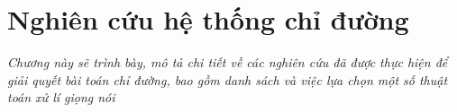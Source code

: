 \chapter{Nghiên cứu hệ thống chỉ đường}
\label{Chapter3}

\emph{Chương này sẽ trình bày, mô tả chi tiết về các nghiên cứu đã được thực hiện để giải quyết bài toán chỉ đường, bao gồm danh sách và việc lựa chọn một số thuật toán xử lí giọng nói}